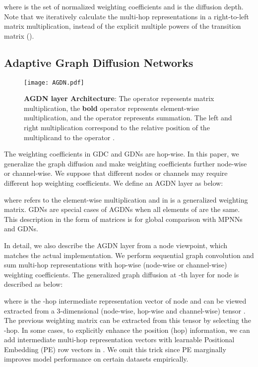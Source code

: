 \documentclass{article}
\begin{document}
where  is the set of normalized weighting coefficients and  is the diffusion depth. Note that we iteratively calculate the multi-hop representations in a right-to-left matrix multiplication, instead of the explicit multiple powers of the transition matrix (). 


\subsection{Adaptive Graph Diffusion Networks}

\begin{figure}[tbp]
    \centering
\texttt{[image: AGDN.pdf]}
    \caption{\textbf{AGDN layer Architecture}: The operator  represents matrix multiplication, the \textbf{bold} operator  represents element-wise multiplication, and the operator  represents summation. The left and right multiplication correspond to the relative position of the multiplicand to the operator .}
    \label{fig:AGDN layer}
\end{figure}

The weighting coefficients in GDC and GDNs are hop-wise. In this paper, we generalize the graph diffusion and make weighting coefficients further node-wise or channel-wise. We suppose that different nodes or channels may require different hop weighting coefficients. We define an AGDN layer as below:



where  refers to the element-wise multiplication and  in  is a generalized weighting matrix. GDNs are special cases of AGDNs when all elements of  are the same. This description in the form of matrices is for global comparison with MPNNs and GDNs.

In detail, we also describe the AGDN layer from a node viewpoint, which matches the actual implementation. We perform sequential graph convolution and sum multi-hop representations with hop-wise (node-wise or channel-wise) weighting coefficients. The generalized graph diffusion at -th layer for node  is described as below:



where  is the -hop intermediate representation vector of node  and  can be viewed extracted from a 3-dimensional (node-wise, hop-wise and channel-wise) tensor . The previous weighting matrix  can be extracted from this tensor by selecting the -hop. In some cases, to explicitly enhance the position (hop) information, we can add intermediate multi-hop representation vectors with learnable Positional Embedding (PE) row vectors  in . We omit this trick since PE marginally improves model performance on certain datasets empirically.
\end{document}
